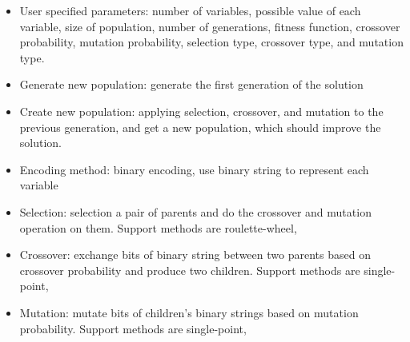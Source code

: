 \documentclass[landscape,a0paper,fontscale=0.285]{baposter} %
\newcommand{\compresslist}{ %
	\setlength{\itemsep}{1pt}
	\setlength{\parskip}{0pt}
	\setlength{\parsep}{0pt}
	}
\begin{document}
\begin{poster}
{\begin{multicols}{2}
	\vspace{3em}

	\begin{itemize}\compresslist
	\item User specified parameters: number of variables, possible value of each variable, size of population, number of generations, fitness function, crossover probability, mutation probability, selection type, crossover type, and mutation type.
	\item Generate new population: generate the first generation of the solution
	\item Create new population: applying selection, crossover, and mutation to the previous generation, and get a new population, which should improve the solution.
	\item Encoding method: binary encoding, use binary string to represent each variable
	\item Selection: selection a pair of parents and do the crossover and mutation operation on them. Support methods are roulette-wheel, 
	\item Crossover: exchange bits of binary string between two parents based on crossover probability and produce two children. Support methods are single-point,
	\item Mutation: mutate bits of children's binary strings based on mutation probability. Support methods are single-point,
	\end{itemize}

	\end{multicols}
	}





\end{poster}
\end{document}
